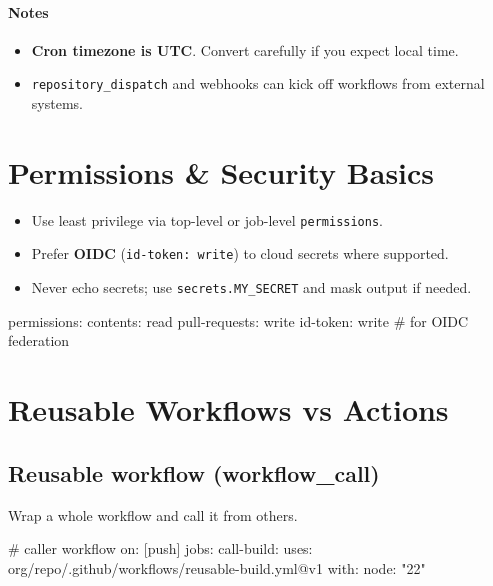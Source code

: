\documentclass[11pt]{article}
\begin{document}
\paragraph{Notes}
\begin{itemize}
  \item \textbf{Cron timezone is UTC}. Convert carefully if you expect local time.
  \item \texttt{repository\_dispatch} and webhooks can kick off workflows from external systems.
\end{itemize}

\section{Permissions \& Security Basics}
\begin{itemize}
  \item Use least privilege via top-level or job-level \texttt{permissions}.
  \item Prefer \textbf{OIDC} (\texttt{id-token: write}) to cloud secrets where supported.
  \item Never echo secrets; use \texttt{secrets.MY\_SECRET} and mask output if needed.
\end{itemize}

\begin{yamlcode}
permissions:
  contents: read
  pull-requests: write
  id-token: write   # for OIDC federation
\end{yamlcode}
\clearpage

\section{Reusable Workflows vs Actions}
\subsection*{Reusable workflow (workflow\_call)}
Wrap a whole workflow and call it from others.

\begin{yamlcode}
# caller workflow
on: [push]
jobs:
  call-build:
    uses: org/repo/.github/workflows/reusable-build.yml@v1
    with:
      node: "22"
\end{yamlcode}
\end{document}
